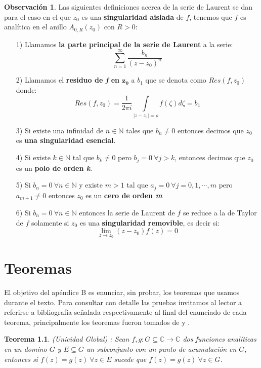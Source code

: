 \documentclass[spanish, openright,oneside]{book}
\newtheorem{teo}{Teorema}[chapter]
\theoremstyle{definition}
\newtheorem{obs}{Observación}[chapter]
\begin{document}
\begin{obs}
Las siguientes definiciones acerca de la serie de Laurent se dan para el caso en el que $z_0$ es una \textbf{singularidad aislada} de $f$, tenemos que $f$ es analítica en el anillo $A_{0,R}(z_0)$ con $R>0$:
\begin{itemize}
\item[1)] Llamamos \textbf{la parte principal de la serie de Laurent} a la serie:
\[ \sum_{n=1}^\infty\frac{b_n}{(z-z_0)^n} \]
\item[2)] Llamamos el \textbf{residuo de \textit{f} en $\boldsymbol{z_0}$} a $b_1$ que se denota como $Res(f,z_0)$ donde:
\[
Res(f,z_0)=\frac{1}{2\pi i} \int\limits_{|z-z_0|=\rho}f(\zeta) d\zeta= b_1
\]
\item[3)] Si existe una infinidad de $n \in \mathbb{N}$ tales que $b_n\neq0$ entonces decimos que $z_0$ es \textbf{una singularidad esencial}.
\item[4)] Si existe $k\in \mathbb{N}$ tal que $b_k\neq0$ pero $b_j=0 \ \forall j>k$, entonces decimos que $z_0$ es un \textbf{polo de orden \textit{k}}.
\item[5)] Si $b_n=0 \ \forall n \in \mathbb{N}$ y existe $m>1$ tal que $a_j=0 \ \forall j=0,1,\cdots, m$ pero $a_{m+1}\neq0$ entonces $z_0$ es un \textbf{cero de orden \textit{m}}
\item[6)] Si $b_n=0 \ \forall n \in \mathbb{N}$ entonces la serie de Laurent de $f$ se reduce a la de Taylor de $f$ solamente si $z_0$ es una \textbf{singularidad removible}, es decir si:
\[
\lim_{z\to z_0}(z-z_0)f(z)=0
\]
\end{itemize}
\end{obs}
\label{C*}
\chapter{Teoremas}\label{aped.B}
El objetivo del apéndice B es enunciar, sin probar, los teoremas que usamos durante el texto. Para consultar con detalle las pruebas invitamos al lector a referirse a bibliografía señalada respectivamente al final del enunciado de cada teorema, principalmente los teoremas fueron tomados de \cite{marku2005} y \cite{marsd1996}.

\begin{teo}\label{uniGlo}{(Unicidad Global)} :
Sean $f,g:G\subseteq\mathbb{C}\rightarrow \mathbb{C}$ dos funciones analíticas en un domino $G$ y $E\subseteq G$ un subconjunto con un punto de acumulación en $G$, entonces si $f(z)=g(z) \ \forall z \in E$ sucede que $f(z)=g(z) \ \forall z \in G $.\ \ \ \textbf{\textsf{\cite{marku2005}}}  
\end{teo}
\end{document}

